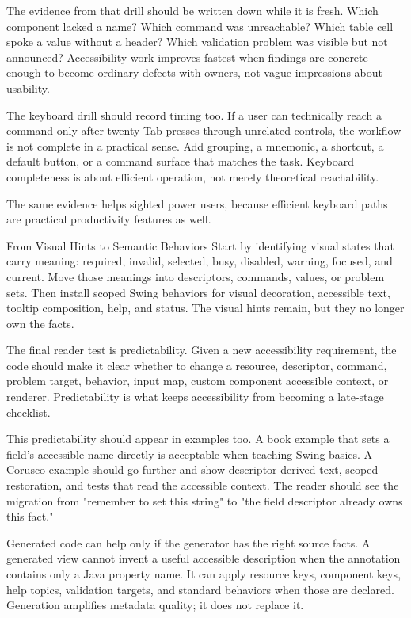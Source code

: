 The evidence from that drill should be written down while it is fresh. Which component lacked a name? Which command was unreachable? Which table cell spoke a value without a header? Which validation problem was visible but not announced? Accessibility work improves fastest when findings are concrete enough to become ordinary defects with owners, not vague impressions about usability.

The keyboard drill should record timing too. If a user can technically reach a command only after twenty Tab presses through unrelated controls, the workflow is not complete in a practical sense. Add grouping, a mnemonic, a shortcut, a default button, or a command surface that matches the task. Keyboard completeness is about efficient operation, not merely theoretical reachability.

The same evidence helps sighted power users, because efficient keyboard paths are practical productivity features as well.

\begin{migrationbox}{From Visual Hints to Semantic Behaviors}
Start by identifying visual states that carry meaning: required, invalid, selected, busy, disabled, warning, focused, and current. Move those meanings into descriptors, commands, values, or problem sets. Then install scoped Swing behaviors for visual decoration, accessible text, tooltip composition, help, and status. The visual hints remain, but they no longer own the facts.
\end{migrationbox}

The final reader test is predictability. Given a new accessibility requirement, the code should make it clear whether to change a resource, descriptor, command, problem target, behavior, input map, custom component accessible context, or renderer. Predictability is what keeps accessibility from becoming a late-stage checklist.

This predictability should appear in examples too. A book example that sets a field's accessible name directly is acceptable when teaching Swing basics. A Corusco example should go further and show descriptor-derived text, scoped restoration, and tests that read the accessible context. The reader should see the migration from "remember to set this string" to "the field descriptor already owns this fact."

Generated code can help only if the generator has the right source facts. A generated view cannot invent a useful accessible description when the annotation contains only a Java property name. It can apply resource keys, component keys, help topics, validation targets, and standard behaviors when those are declared. Generation amplifies metadata quality; it does not replace it.

